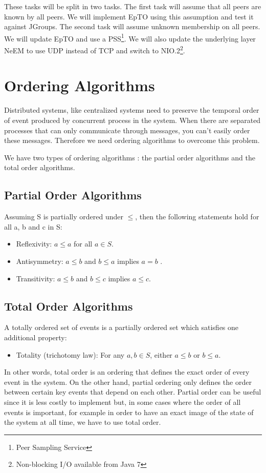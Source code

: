 \documentclass[10pt,conference,a4paper]{IEEEtran}
\begin{document}
These tasks will be split in two tasks. The first task will assume that all peers are known by all peers. We will implement EpTO using this assumption and test it against JGroups. The second task will assume unknown membership on all peers. We will update EpTO and use a PSS\footnote{Peer Sampling Service}. We will also update the underlying layer NeEM \autocite{neem} to use UDP instead of TCP and switch to NIO.2\footnote{Non-blocking I/O available from Java 7}.

\section{Ordering Algorithms}

Distributed systems, like centralized systems need to preserve the temporal order of event produced by concurrent process in the system. When there are separated processes that can only communicate through messages, you can’t easily order these messages.
Therefore we need ordering algorithms to overcome this problem.
\par
We have two types of ordering algorithms \autocite{lamport1978time}: the partial order algorithms and the total order algorithms.
\subsection{Partial Order Algorithms}
Assuming S is partially ordered under $\leq$, then the following statements hold for all a, b and c in S:
\begin{itemize}
	\item Reflexivity: $a \leq a$ for all $a \in S$.
	\item Antisymmetry: $a \leq b$ and $b \leq a$ implies $a=b$ .
	\item Transitivity: $a \leq b$  and $b \leq c$  implies $a \leq c$.
\end{itemize}

\subsection{Total Order Algorithms}
A totally ordered set of events is a partially ordered set which satisfies one additional property:
\begin{itemize}
	\item Totality (trichotomy law): For any $a, b \in S$, either $a \leq b$  or $b \leq a$.
\end{itemize}
\par
In other words, total order is an ordering that defines the exact order of every event in the system. On the other hand, partial ordering only defines the order between certain key events that depend on each other. Partial order can be useful since it is less costly to implement but, in some cases where the order of all events is important, for example in order to have an exact image of the state of the system at all time, we have to use total order.
\end{document}

